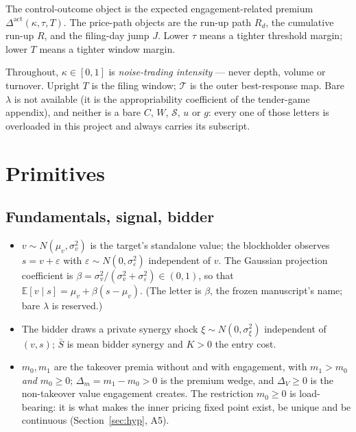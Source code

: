 \documentclass[11pt,a4paper]{article}
\newcommand{\Eop}{\mathbb{E}}
\newcommand{\Dact}{\Delta^{\mathrm{act}}}
\newcommand{\Tmap}{\mathcal{T}}
\begin{document}
The control-outcome object is the expected engagement-related premium
$\Dact(\kappa,\tau,T)$. The price-path objects are the run-up path $R_d$, the
cumulative run-up $R$, and the filing-day jump $J$. Lower $\tau$ means a tighter
threshold margin; lower $T$ means a tighter window margin.

Throughout, $\kappa\in[0,1]$ is \emph{noise-trading intensity} --- never depth,
volume or turnover. Upright $T$ is the filing window; $\Tmap$ is the outer
best-response map. Bare $\lambda$ is not available (it is the appropriability
coefficient of the tender-game appendix), and neither is a bare $C$, $W$,
$\mathcal S$, $u$ or $g$: every one of those letters is overloaded in this project
and always carries its subscript.

\section{Primitives}

\subsection*{Fundamentals, signal, bidder}

\begin{itemize}
\item $v\sim N(\mu_v,\sigma_v^2)$ is the target's standalone value; the blockholder
  observes $s=v+\varepsilon$ with $\varepsilon\sim N(0,\sigma_\varepsilon^2)$
  independent of $v$. The Gaussian projection coefficient is
  $\beta=\sigma_v^2/(\sigma_v^2+\sigma_\varepsilon^2)\in(0,1)$, so that
  $\Eop[v\mid s]=\mu_v+\beta(s-\mu_v)$. (The letter is $\beta$, the frozen
  manuscript's name; bare $\lambda$ is reserved.)
\item The bidder draws a private synergy shock $\xi\sim N(0,\sigma_\xi^2)$
  independent of $(v,s)$; $\bar S$ is mean bidder synergy and $K>0$ the entry cost.
\item $m_0,m_1$ are the takeover premia without and with engagement, with
  $m_1>m_0$ \emph{and} $m_0\ge0$; $\Delta_m=m_1-m_0>0$ is the premium wedge, and
  $\Delta_V\ge0$ is the non-takeover value engagement creates. The restriction
  $m_0\ge0$ is load-bearing: it is what makes the inner pricing fixed point exist,
  be unique and be continuous (Section~\ref{sec:hyp}, A5).
\end{itemize}
\end{document}
